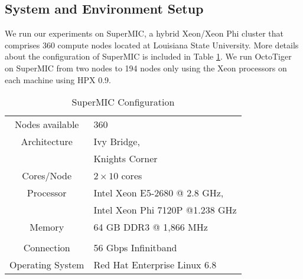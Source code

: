 \subsection{System and Environment Setup}
We run our experiments on SuperMIC, a hybrid Xeon/Xeon Phi cluster that
comprises 360 compute nodes located at Louisiana State University. More
details about the configuration of SuperMIC is included in Table
\ref{tab:machines}. We run OctoTiger on SuperMIC from
two nodes to 194 nodes only using the Xeon processors on each machine using
HPX 0.9\cite{hartmut_kaiser_2015_33656}.


\begin{table}
    \caption{SuperMIC Configuration}
    \centering
    \label{tab:machines}
    \begin{tabular}{cl}  
        \toprule
        Nodes available  & 360                             \\
        Architecture     & Ivy Bridge,                     \\
                         & Knights Corner                  \\
        Cores/Node       & $2 \times 10$ cores             \\
        Processor        & Intel Xeon E5-2680 @ 2.8 GHz,   \\
                         & Intel Xeon Phi 7120P @1.238 GHz \\
        Memory           & 64 GB DDR3 @ 1,866 MHz          \\
                         &                                 \\
        Connection       & 56 Gbps Infinitband             \\
        Operating System & Red Hat Enterprise Linux 6.8    \\
        \bottomrule
    \end{tabular}
\end{table}

